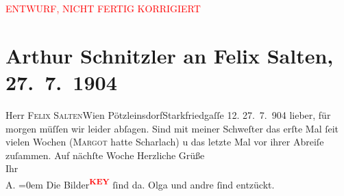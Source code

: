 
\begin{center}
            \textcolor{red}{ENTWURF, NICHT FERTIG KORRIGIERT}
                      \end{center}
            
         
         \renewcommand{\erwaehntePersonen}{Personen: Gisela Hajek, Felix Salten, Olga Schnitzler, Margot Vallo}
         \renewcommand{\erwaehnteOrte}{Orte: Pötzleinsdorf, Starkfriedgassse, VIII., Josefstadt, Wien}
         \renewcommand{\erwaehnteWerke}{}
               \section[Arthur Schnitzler an Felix Salten, 27. 7. 1904]{ Arthur Schnitzler an Felix Salten, 27. 7. 1904}\nopagebreak{}\rehead{ }\begin{ledgroupsized}[t]{13cm}\normalsize\beginnumbering \toendnotes[C]{\smallbreak\pagebreak[2]} 
\toendnotes[C]{\smallbreak}\pstart{}{\pb}Herr \textsc{Felix Salten}\pend{}\pstart{}Wien Pötzleinsdorf\pend{}\pstart{}Starkfriedgaſſe 12. \pend{}{\bigskip}\pstart
           \raggedleft{}{\pb}27. 7. 904\pend
           \pstart
           lieber, für morgen müſſen wir leider abſagen. Sind mit meiner Schweſter das erſte Mal ſeit vielen Wochen (\textsc{Margot} hatte Scharlach) u das letzte Mal vor ihrer Abreiſe zuſammen. \pend
           \pstart
           Auf nächſte Woche \pend
           \pstart
           Herzliche Grüße {\\[\baselineskip]}Ihr {\\[\baselineskip]}\spacefill\mbox{A.}\pend
           \leftskip=0em{}\pstart
           Die Bilder\textcolor{red}{\textsuperscript{\textbf{KEY}}} ſind da. Olga und andre ſind entzückt. \pend
           
         
         \endnumbering{}\end{ledgroupsized}\begin{anhang}\end{anhang}\newcommand{\dateiname}{L02992}\newcommand{\titel}{Arthur Schnitzler an Felix Salten, 27. 7. 1904}\newcommand{\editorInnen}{Martin Anton Müller und Laura Untner}
      